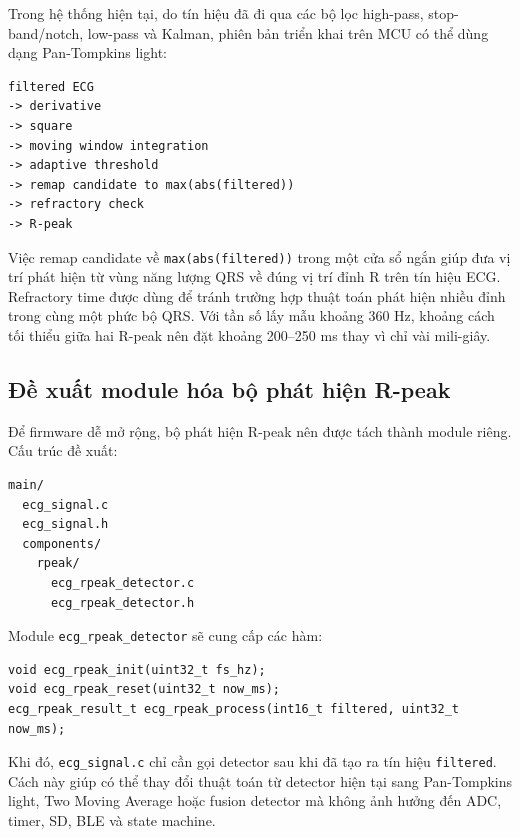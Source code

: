 Trong hệ thống hiện tại, do tín hiệu đã đi qua các bộ lọc high-pass,
stop-band/notch, low-pass và Kalman, phiên bản triển khai trên MCU có thể dùng
dạng Pan-Tompkins light:

\begin{verbatim}
filtered ECG
-> derivative
-> square
-> moving window integration
-> adaptive threshold
-> remap candidate to max(abs(filtered))
-> refractory check
-> R-peak
\end{verbatim}

Việc remap candidate về \texttt{max(abs(filtered))} trong một cửa sổ ngắn giúp
đưa vị trí phát hiện từ vùng năng lượng QRS về đúng vị trí đỉnh R trên tín hiệu
ECG. Refractory time được dùng để tránh trường hợp thuật toán phát hiện nhiều
đỉnh trong cùng một phức bộ QRS. Với tần số lấy mẫu khoảng 360 Hz, khoảng cách
tối thiểu giữa hai R-peak nên đặt khoảng 200--250 ms thay vì chỉ vài mili-giây.

\subsection{Đề xuất module hóa bộ phát hiện R-peak}

Để firmware dễ mở rộng, bộ phát hiện R-peak nên được tách thành module riêng.
Cấu trúc đề xuất:

\begin{verbatim}
main/
  ecg_signal.c
  ecg_signal.h
  components/
    rpeak/
      ecg_rpeak_detector.c
      ecg_rpeak_detector.h
\end{verbatim}

Module \texttt{ecg\_rpeak\_detector} sẽ cung cấp các hàm:

\begin{verbatim}
void ecg_rpeak_init(uint32_t fs_hz);
void ecg_rpeak_reset(uint32_t now_ms);
ecg_rpeak_result_t ecg_rpeak_process(int16_t filtered, uint32_t now_ms);
\end{verbatim}

Khi đó, \texttt{ecg\_signal.c} chỉ cần gọi detector sau khi đã tạo ra tín hiệu
\texttt{filtered}. Cách này giúp có thể thay đổi thuật toán từ detector hiện
tại sang Pan-Tompkins light, Two Moving Average hoặc fusion detector mà không
ảnh hưởng đến ADC, timer, SD, BLE và state machine.
